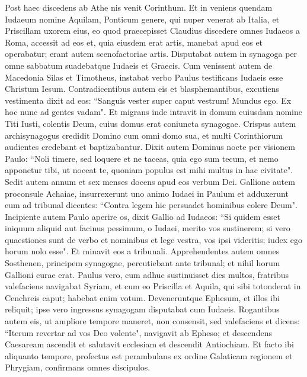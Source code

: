 \begin{biblechapter}  
\verse Post haec discedens ab Athe nis venit Corinthum. 
\verse Et in veniens quendam Iudaeum nomine Aquilam, Ponticum genere, qui nuper venerat ab Italia, et Priscillam uxorem eius, eo quod praecepisset Claudius discedere omnes Iudaeos a Roma, accessit ad eos 
\verse et, quia eiusdem erat artis, manebat apud eos et operabatur; erant autem scenofactoriae artis. 
\verse Disputabat autem in synagoga per omne sabbatum suadebatque Iudaeis et Graecis. 
\verse Cum venissent autem de Macedonia Silas et Timotheus, instabat verbo Paulus testificans Iudaeis esse Christum Iesum. 
\verse Contradicentibus autem eis et blasphemantibus, excutiens vestimenta dixit ad eos: “Sanguis vester super caput vestrum! Mundus ego. Ex hoc nunc ad gentes vadam". 
\verse Et migrans inde intravit in domum cuiusdam nomine Titi Iusti, colentis Deum, cuius domus erat coniuncta synagogae. 
\verse Crispus autem archisynagogus credidit Domino cum omni domo sua, et multi Corinthiorum audientes credebant et baptizabantur. 
\verse Dixit autem Dominus nocte per visionem Paulo: “Noli timere, sed loquere et ne taceas, 
\verse quia ego sum tecum, et nemo apponetur tibi, ut noceat te, quoniam populus est mihi multus in hac civitate". 
\verse Sedit autem annum et sex menses docens apud eos verbum Dei. 
\verse Gallione autem proconsule Achaiae, insurrexerunt uno animo Iudaei in Paulum et adduxerunt eum ad tribunal 
\verse dicentes: “Contra legem hic persuadet hominibus colere Deum". 
\verse Incipiente autem Paulo aperire os, dixit Gallio ad Iudaeos: “Si quidem esset iniquum aliquid aut facinus pessimum, o Iudaei, merito vos sustinerem; 
\verse si vero quaestiones sunt de verbo et nominibus et lege vestra, vos ipsi videritis; iudex ego horum nolo esse". 
\verse Et minavit eos a tribunali. 
\verse Apprehendentes autem omnes Sosthenen, principem synagogae, percutiebant ante tribunal; et nihil horum Gallioni curae erat. 
\verse Paulus vero, cum adhuc sustinuisset dies multos, fratribus valefaciens navigabat Syriam, et cum eo Priscilla et Aquila, qui sibi totonderat in Cenchreis caput; habebat enim votum. 
\verse Deveneruntque Ephesum, et illos ibi reliquit; ipse vero ingressus synagogam disputabat cum Iudaeis. 
\verse Rogantibus autem eis, ut ampliore tempore maneret, non consensit, 
\verse sed valefaciens et dicens: “Iterum revertar ad vos Deo volente", navigavit ab Epheso; 
\verse et descendens Caesaream ascendit et salutavit ecclesiam et descendit Antiochiam. 
\verse Et facto ibi aliquanto tempore, profectus est perambulans ex ordine Galaticam regionem et Phrygiam, confirmans omnes discipulos. 

\end{biblechapter}
